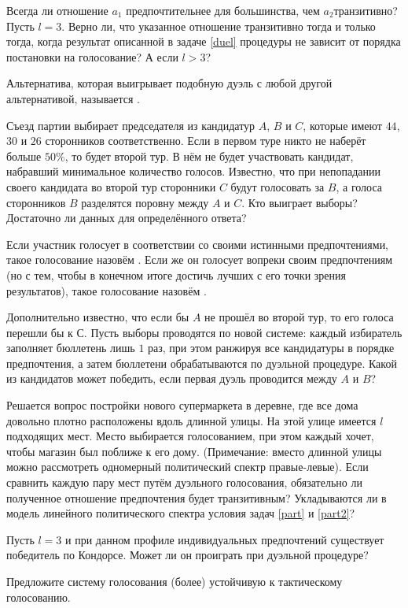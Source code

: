 \documentclass[a4paper,11pt]{article}
\begin{document}
  Всегда ли отношение  $a_1$ предпочтительнее для
большинства, чем $a_2$ транзитивно?  Пусть $l = 3$. Верно
ли, что указанное отношение транзитивно тогда и только тогда, когда
результат описанной в задаче \ref{duel} процедуры не зависит от
порядка постановки на голосование? А если $l > 3$? 

 Альтернатива, которая выигрывает подобную дуэль с любой другой
альтернативой, называется . 

 \label{part} Съезд партии выбирает председателя из
кандидатур $A$, $B$ и $C$, которые имеют $44$, $30$ и $26$
сторонников соответственно. Если в первом туре никто не наберёт
больше $50\%$, то будет второй тур. В нём не будет участвовать
кандидат, набравший минимальное количество голосов. Известно, что
при непопадании своего кандидата во второй тур сторонники $C$ будут
голосовать за $B$, а голоса сторонников $B$ разделятся поровну между
$A$ и $C$. Кто выиграет выборы? Достаточно ли данных для
определённого ответа? 

 Если участник голосует в соответствии со своими истинными
предпочтениями, такое голосование назовём . Если же
он голосует вопреки своим предпочтениям (но с тем, чтобы в конечном
итоге достичь лучших с его точки зрения результатов), такое
голосование назовём . 

 \label{part2} Дополнительно известно, что если бы $A$ не
прошёл во второй тур, то его голоса перешли бы к $С$. Пусть выборы
проводятся по новой системе: каждый избиратель заполняет бюллетень
лишь $1$ раз, при этом ранжируя все кандидатуры в порядке
предпочтения, а затем бюллетени обрабатываются по дуэльной
процедуре. Какой из кандидатов может победить, если первая дуэль
проводится между $A$ и $B$? 

 Решается вопрос постройки нового супермаркета в деревне, где
все дома довольно плотно расположены вдоль длинной улицы. На этой
улице имеется $l$ подходящих мест. Место выбирается голосованием,
при этом каждый хочет, чтобы магазин был поближе к его дому.
(Примечание: вместо длинной улицы можно рассмотреть одномерный
политический спектр  правые-левые).  Если сравнить
каждую пару мест путём дуэльного голосования, обязательно ли
полученное отношение предпочтения будет транзитивным? 
Укладываются ли в модель  линейного политического спектра
условия задач \ref{part} и \ref{part2}? 

 Пусть $l = 3$ и при данном профиле индивидуальных
предпочтений существует победитель по Кондорсе. Может ли он
проиграть при дуэльной процедуре? 

 Предложите систему голосования (более) устойчивую к
тактическому голосованию. 

\end{document}
